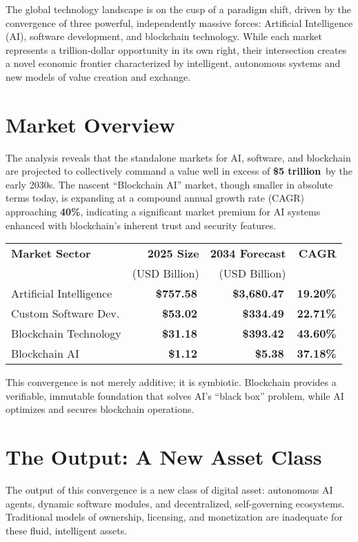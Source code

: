 \documentclass[11pt,a4paper]{report}
\newcommand{\marketvalue}[2]{\textcolor{trust}{\textbf{\$#1}}\,\textcolor{darkgray}{#2}}
\newcommand{\cagr}[1]{\textcolor{sun}{\textbf{#1\%}}}
\begin{document}
The global technology landscape is on the cusp of a paradigm shift, driven by the convergence of three powerful, independently massive forces: Artificial Intelligence (AI), software development, and blockchain technology. While each market represents a trillion-dollar opportunity in its own right, their intersection creates a novel economic frontier characterized by intelligent, autonomous systems and new models of value creation and exchange.

\section*{Market Overview}
The analysis reveals that the standalone markets for AI, software, and blockchain are projected to collectively command a value well in excess of \marketvalue{5 trillion}{} by the early 2030s. The nascent ``Blockchain AI'' market, though smaller in absolute terms today, is expanding at a compound annual growth rate (CAGR) approaching \cagr{40}, indicating a significant market premium for AI systems enhanced with blockchain's inherent trust and security features.

\begin{marketfigure}
\centering
\begin{tabular}{lrrr}
\toprule
\textbf{Market Sector} & \textbf{2025 Size} & \textbf{2034 Forecast} & \textbf{CAGR} \\
& (USD Billion) & (USD Billion) & \\
\midrule
Artificial Intelligence & \marketvalue{757.58}{} & \marketvalue{3,680.47}{} & \cagr{19.20} \\
Custom Software Dev. & \marketvalue{53.02}{} & \marketvalue{334.49}{} & \cagr{22.71} \\
Blockchain Technology & \marketvalue{31.18}{} & \marketvalue{393.42}{} & \cagr{43.60} \\
Blockchain AI & \marketvalue{1.12}{} & \marketvalue{5.38}{} & \cagr{37.18} \\
\bottomrule
\end{tabular}
\end{marketfigure}

This convergence is not merely additive; it is symbiotic. Blockchain provides a verifiable, immutable foundation that solves AI's ``black box'' problem, while AI optimizes and secures blockchain operations.

\section*{The Output: A New Asset Class}
The output of this convergence is a new class of digital asset: autonomous AI agents, dynamic software modules, and decentralized, self-governing ecosystems. Traditional models of ownership, licensing, and monetization are inadequate for these fluid, intelligent assets. 
\end{document}
